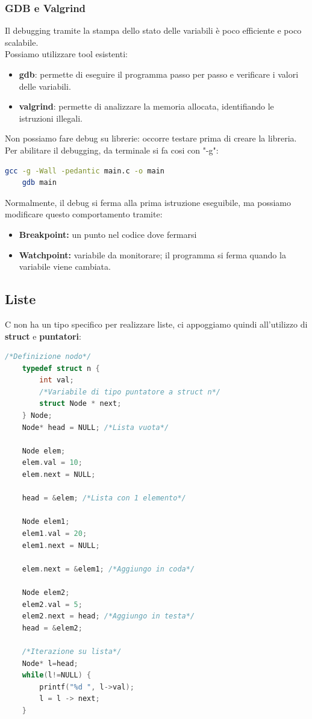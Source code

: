 \documentclass[12pt,a4paper]{article}
\begin{document}
\subsubsection{GDB e Valgrind}
Il debugging tramite la stampa dello stato delle variabili è poco efficiente e poco scalabile.\\
Possiamo utilizzare tool esistenti:
\begin{itemize}
    \item \textbf{gdb}: permette di eseguire il programma passo per passo e verificare i valori delle variabili.
    \item \textbf{valgrind}: permette di analizzare la memoria allocata, identifiando le istruzioni illegali.
\end{itemize}
Non possiamo fare debug su librerie: occorre testare prima di creare la libreria.\\
Per abilitare il debugging, da terminale si fa cosi con "-g":
\begin{lstlisting}[language=bash]
    gcc -g -Wall -pedantic main.c -o main
    gdb main
\end{lstlisting}
Normalmente, il debug si ferma alla prima istruzione eseguibile, ma possiamo modificare questo comportamento tramite:
\begin{itemize}
    \item \textbf{Breakpoint:} un punto nel codice dove fermarsi
    \item \textbf{Watchpoint:} variabile da monitorare; il programma si ferma quando la variabile viene cambiata.
\end{itemize}
\subsection{Liste}
C non ha un tipo specifico per realizzare liste, ci appoggiamo quindi all'utilizzo di \textbf{struct} e \textbf{puntatori}:
\begin{lstlisting}[language=C]
    /*Definizione nodo*/
    typedef struct n {
        int val;
        /*Variabile di tipo puntatore a struct n*/
        struct Node * next;
    } Node;
    Node* head = NULL; /*Lista vuota*/
    
    Node elem;
    elem.val = 10;
    elem.next = NULL;

    head = &elem; /*Lista con 1 elemento*/

    Node elem1;
    elem1.val = 20;
    elem1.next = NULL; 
    
    elem.next = &elem1; /*Aggiungo in coda*/

    Node elem2;
    elem2.val = 5;
    elem2.next = head; /*Aggiungo in testa*/
    head = &elem2;

    /*Iterazione su lista*/
    Node* l=head;
    while(l!=NULL) {
        printf("%d ", l->val);
        l = l -> next;
    }
\end{lstlisting}
\end{document}
